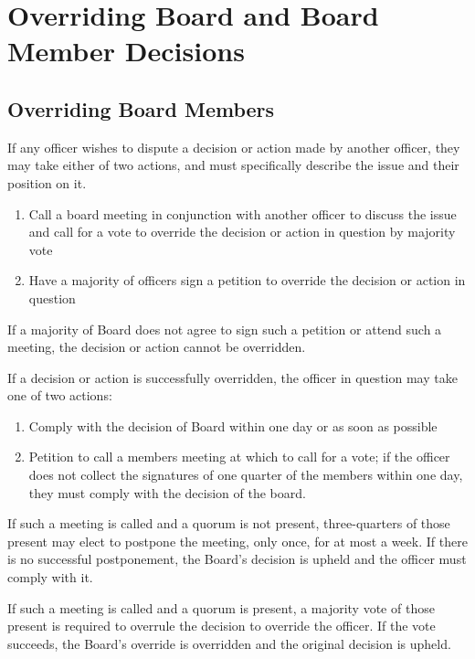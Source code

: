 \section{Overriding Board and Board Member Decisions}
\label{sec:overriding-board-decisions}



\subsection{Overriding Board Members}

If any officer wishes to dispute a decision or action made by another officer, they may take either of two actions, and must specifically describe the issue and their position on it.
\begin{enumerate}
	\item Call a board meeting in conjunction with another officer to discuss the issue and call for a vote to override the decision or action in question by majority vote
	\item Have a majority of officers sign a petition to override the decision or action in question
\end{enumerate}
If a majority of Board does not agree to sign such a petition or attend such a meeting, the decision or action cannot be overridden.

If a decision or action is successfully overridden, the officer in question may take one of two actions:
\begin{enumerate}
	\item Comply with the decision of Board within one day or as soon as possible
	\item Petition to call a members meeting at which to call for a vote; if the officer does not collect the signatures of one quarter of the members within one day, they must comply with the decision of the board.
\end{enumerate}
If such a meeting is called and a quorum is not present, three-quarters of those present may elect to postpone the meeting, only once, for at most a week. If there is no successful postponement, the Board's decision is upheld and the officer must comply with it.

If such a meeting is called and a quorum is present, a majority vote of those present is required to overrule the decision to override the officer. If the vote succeeds, the Board's override is overridden and the original decision is upheld.



